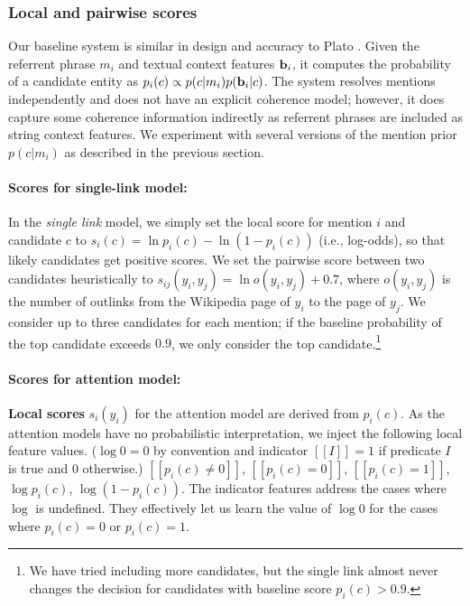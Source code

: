 \subsubsection{Local and pairwise scores}
\label{sec:expt:features}

Our baseline system is similar in design and accuracy to Plato \cite{Lazic2015}.
Given the referrent phrase $m_i$ and textual context features ${\bf b}_i$, it computes
the probability of a candidate entity as $p_i(c) \propto p(c|m_i)p({\bf b}_i|c)$. 
The system resolves mentions independently and does not have an explicit coherence model;
however, it does capture some coherence information indirectly as referrent phrases are
included as string context features. We experiment with several versions of the
mention prior $p(c|m_i)$ as described in the previous section.


\paragraph*{Scores for single-link model:}
In the \emph{single link} model, we simply set the local score for
mention $i$ and candidate $c$ to $s_i(c) = \ln p_i(c) - \ln (1 -
p_i(c))$ (i.e., log-odds), so that likely candidates get positive
scores.  We set the pairwise score between two candidates heuristically to
$s_{ij}(y_i, y_j) = \ln o(y_i, y_j) + 0.7$, where $o(y_i, y_j)$ is the number of
outlinks from the Wikipedia page of $y_i$ to the page of $y_j$.  We
consider up to three candidates for each mention; if the baseline
probability of the top candidate exceeds $0.9$, we only consider the top
candidate.\footnote{We have tried including more candidates, but the single link
almost never changes the decision for candidates with baseline score $p_i(c)>0.9$.}


\def\ind#1{[\![ #1 ]\!]}


\paragraph*{Scores for attention model:}
\textbf{Local scores} $s_i(y_i)$ for the attention model are derived
from $p_i(c)$.  As the attention models have no probabilistic
interpretation, we inject the following local feature values.
($\log0=0$ by convention and indicator $\ind{I}=1$ if predicate $I$ is
true and 0 otherwise.)  $\ind{p_i(c)\ne 0}$, $\ind{p_i(c)=0}$,
$\ind{p_i(c)=1}$, $\log p_i(c)$, $\log(1-p_i(c))$.  The indicator
features address the cases where $\log$ is undefined.  They
effectively let us learn the value of $\log{0}$ for the cases where
$p_i(c)=0$ or $p_i(c)=1$.


